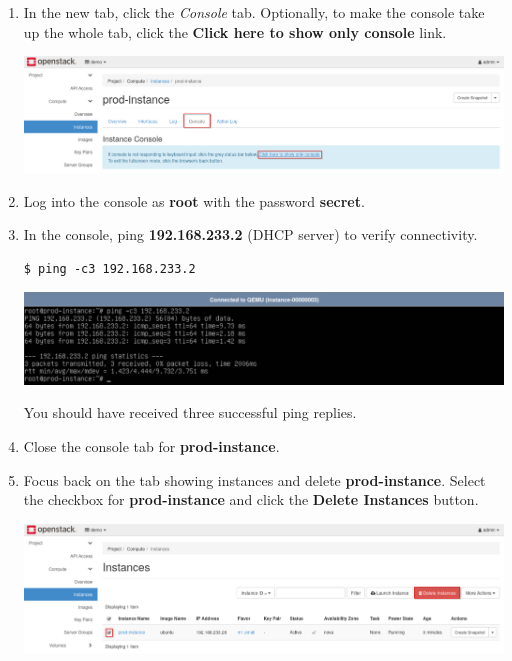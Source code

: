 \documentclass[letterpaper, 12pt]{article}
\begin{document}
\begin{enumerate}
    \item In the new tab, click the \textit{Console} tab. Optionally, to make the console take up the whole tab, click
    the \textbf{Click here to show only console} link.
    
    \begin{center}
        \includegraphics[width=\linewidth]{images/part1/step11.png}
    \end{center}

    \item Log into the console as \textbf{root} with the password \textbf{secret}.

    \item In the console, ping \textbf{192.168.233.2} (DHCP server) to verify connectivity.
\begin{lstlisting}
$ ping -c3 192.168.233.2
\end{lstlisting}

    \begin{center}
        \includegraphics[width=\linewidth]{images/part1/step13.png}
    \end{center}

    \begin{notebox}{}
        You should have received three successful ping replies.
    \end{notebox}

    \item Close the console tab for \textbf{prod-instance}.

    \item Focus back on the tab showing instances and delete \textbf{prod-instance}. Select the checkbox for
    \textbf{prod-instance} and click the \textbf{Delete Instances} button.

    \begin{center}
        \includegraphics[width=\linewidth]{images/part1/step15.png}
    \end{center}


\end{enumerate}
\end{document}
